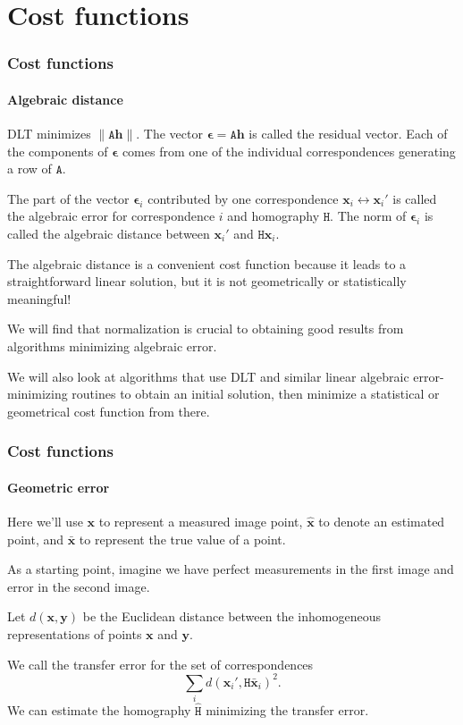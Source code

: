 \documentclass[aspectratio=169]{beamer}
\renewcommand{\vec}[1]{\boldsymbol{#1}}
\newcommand{\mat}[1]{\mathtt{#1}}
\begin{document}
\section{Cost functions}

\begin{frame}
\frametitle{Cost functions}
\framesubtitle{Algebraic distance}

DLT minimizes $\|\mat{A}\vec{h}\|$.  The vector $\vec{\epsilon} =
\mat{A}\vec{h}$ is called the \alert{residual vector}.  Each of the
components of $\vec{\epsilon}$ comes from one of the individual
correspondences generating a row of $\mat{A}$.

\medskip

The part of the vector $\vec{\epsilon}_i$ contributed by one
correspondence $\vec{x}_i \leftrightarrow \vec{x}_i'$ is called the
\alert{algebraic error} for correspondence $i$ and homography
$\mat{H}$.  The norm of $\vec{\epsilon}_i$ is called the
\alert{algebraic distance} between $\vec{x}_i'$ and
$\mat{H}\vec{x}_i$.

\medskip

The algebraic distance is a convenient cost function because it leads
to a straightforward linear solution, but \alert{it is not
geometrically or statistically meaningful}!

\medskip

We will find that \alert{normalization} is crucial to obtaining good
results from algorithms minimizing algebraic error.

\medskip

We will also look at algorithms that use DLT and similar linear
algebraic error-minimizing routines to obtain an initial solution,
then minimize a statistical or geometrical cost function from there.

\end{frame}

\begin{frame}
\frametitle{Cost functions}
\framesubtitle{Geometric error}

Here we'll use $\vec{x}$ to represent a \alert{measured} image point,
$\hat{\vec{x}}$ to denote an \alert{estimated} point, and
$\bar{\vec{x}}$ to represent the \alert{true value} of a point.

\medskip

As a starting point, imagine we have perfect measurements in the first
image and error in the second image.

\medskip

Let $d(\vec{x},\vec{y})$ be the \alert{Euclidean} distance between the
\alert{inhomogeneous} representations of points $\vec{x}$ and
$\vec{y}$.

\medskip

We call the \alert{transfer error} for the set of correspondences
\begin{equation*}
\sum_i d(\vec{x}_i',\mat{H}\bar{\vec{x}}_i)^2.
\end{equation*}
We can estimate the homography $\hat{\mat{H}}$ minimizing the
transfer error.

\end{frame}
\end{document}
